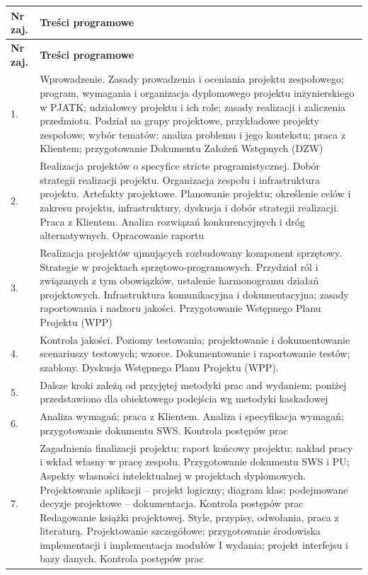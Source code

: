 \documentclass[12pt, a4paper]{article}
\newcommand{\thdrule}{\noalign{\global\setlength{\extrarowheight}{0pt}}}
\newcommand{\thdend}{\noalign{\global\setlength{\extrarowheight}{3pt}}}
\begin{document}
{\scriptsize
\begin{longtable}{m{1.5cm}m{14.5cm}}
\thdrule\toprule
\rowcolor{pjatkRed} {\color{white}\textbf{Nr zaj.}} & {\color{white}\textbf{Treści programowe}} \\
\midrule\thdend
\endfirsthead
\thdrule\toprule
\rowcolor{pjatkRed} {\color{white}\textbf{Nr zaj.}} & {\color{white}\textbf{Treści programowe}} \\
\midrule\thdend
\endhead
  \rowcolor{tableRowLight} 1. & Wprowadzenie. Zasady prowadzenia i oceniania projektu zespołowego; program, wymagania i organizacja dyplomowego projektu inżynierskiego w PJATK; udziałowcy projektu i ich role; zasady realizacji i zaliczenia przedmiotu. Podział na grupy projektowe, przykładowe projekty zespołowe; wybór tematów; analiza problemu i jego kontekstu; praca z Klientem; przygotowanie Dokumentu Założeń Wstępnych (DZW) \\
  \rowcolor{tableRowAlt} 2. & Realizacja projektów o specyfice stricte programistycznej. Dobór strategii realizacji projektu. Organizacja zespołu i infrastruktura projektu. Artefakty projektowe. Planowanie projektu; określenie celów i zakresu projektu, infrastruktury, dyskusja i dobór strategii realizacji. Praca z Klientem. Analiza rozwiązań konkurencyjnych i dróg alternatywnych. Opracowanie raportu \\
  \rowcolor{tableRowLight} 3. & Realizacja projektów ujmujących rozbudowany komponent sprzętowy. Strategie w projektach sprzętowo-programowych. Przydział ról i związanych z tym obowiązków, ustalenie harmonogramu działań projektowych. Infrastruktura komunikacyjna i dokumentacyjna; zasady raportowania i nadzoru jakości. Przygotowanie Wstępnego Planu Projektu (WPP) \\
  \rowcolor{tableRowAlt} 4. & Kontrola jakości. Poziomy testowania; projektowanie i dokumentowanie scenariuszy testowych; wzorce. Dokumentowanie i raportowanie testów; szablony. Dyskusja Wstępnego Planu Projektu (WPP). \\
  \rowcolor{tableRowLight} 5. & Dalsze kroki zależą od przyjętej metodyki prac and wydaniem; poniżej przedstawiono dla obiektowego podejścia wg metodyki kaskadowej \\
  \rowcolor{tableRowAlt} 6. & Analiza wymagań; praca z Klientem. Analiza i specyfikacja wymagań; przygotowanie dokumentu SWS. Kontrola postępów prac \\
  \rowcolor{tableRowLight} 7. & Zagadnienia finalizacji projektu; raport końcowy projektu; nakład pracy i wkład własny w pracę zespołu. Przygotowanie dokumentu SWS i PU; Aspekty własności intelektualnej w projektach dyplomowych. Projektowanie aplikacji – projekt logiczny; diagram klas; podejmowane decyzje projektowe – dokumentacja. Kontrola postępów prac Redagowanie książki projektowej. Style, przypisy, odwołania, praca z literaturą. Projektowanie szczegółowe; przygotowanie środowiska implementacji i implementacja modułów I wydania; projekt interfejsu i bazy danych. Kontrola postępów prac \\

\end{longtable}}
\end{document}
